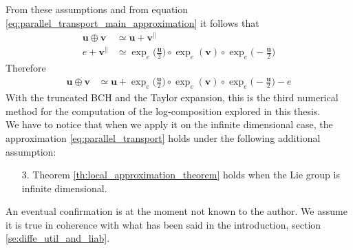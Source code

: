 From these assumptions and from equation \ref{eq:parallel_transport_main_approximation} it follows that 
\begin{align*}
\mathbf{u}\oplus \mathbf{v}
&\simeq
\mathbf{u} + \mathbf{v}^{\parallel}
\\
e + \mathbf{v}^{\parallel}
&\simeq
\exp_{e}\big(\frac{\mathbf{u}}{2}\big)   
\circ  \exp_{e}(\mathbf{v}) 
\circ \exp_{e}\big(-\frac{\mathbf{u}}{2}\big)
\end{align*}
Therefore
\begin{align}\label{eq:parallel_transport}
\mathbf{u}\oplus \mathbf{v}
&\simeq
\mathbf{u} 
+
\exp_{e}\big(\frac{\mathbf{u}}{2}\big)   
\circ  \exp_{e}(\mathbf{v}) 
\circ \exp_{e}\big(-\frac{\mathbf{u}}{2}\big)
 -
 e
\end{align}
With the truncated BCH and the Taylor expansion, this is the third numerical method for the computation of the log-composition explored in this thesis.\\
We have to notice that when we apply it on the infinite dimensional case, the approximation \ref{eq:parallel_transport} holds under the following additional assumption:
\begin{enumerate}
\item[3.] Theorem \ref{th:local_approximation_theorem} holds when the Lie group is infinite dimensional.
\end{enumerate}
An eventual confirmation is at the moment not known to the author. We assume it is true in coherence with what has been said in the introduction, section \ref{se:diffe_util_and_liab}.










